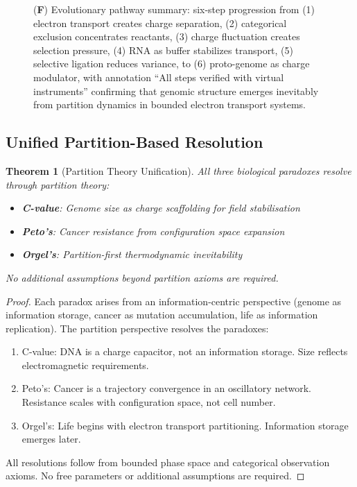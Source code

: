 \documentclass[11pt,a4paper]{article}
\newtheorem{theorem}{Theorem}[section]
\theoremstyle{remark}
\begin{document}
\begin{figure}[htbp]
{(\textbf{F}) Evolutionary pathway summary: six-step progression from (1) electron transport creates charge separation, (2) categorical exclusion concentrates reactants, (3) charge fluctuation creates selection pressure, (4) RNA as buffer stabilizes transport, (5) selective ligation reduces variance, to (6) proto-genome as charge modulator, with annotation ``All steps verified with virtual instruments'' confirming that genomic structure emerges inevitably from partition dynamics in bounded electron transport systems.}
\label{fig:electron_to_genome}
\end{figure}

\subsection{Unified Partition-Based Resolution}

\begin{theorem}[Partition Theory Unification]
\label{thm:partition_unification}
All three biological paradoxes resolve through partition theory:
\begin{itemize}
\item \textbf{C-value}: Genome size as charge scaffolding for field stabilisation
\item \textbf{Peto's}: Cancer resistance from configuration space expansion
\item \textbf{Orgel's}: Partition-first thermodynamic inevitability
\end{itemize}
No additional assumptions beyond partition axioms are required.
\end{theorem}

\begin{proof}
Each paradox arises from an information-centric perspective (genome as information storage, cancer as mutation accumulation, life as information replication). The partition perspective resolves the paradoxes:
\begin{enumerate}
\item C-value: DNA is a charge capacitor, not an information storage. Size reflects electromagnetic requirements.
\item Peto's: Cancer is a trajectory convergence in an oscillatory network. Resistance scales with configuration space, not cell number.
\item Orgel's: Life begins with electron transport partitioning. Information storage emerges later.
\end{enumerate}
All resolutions follow from bounded phase space and categorical observation axioms. No free parameters or additional assumptions are required.
\end{proof}
\end{document}
